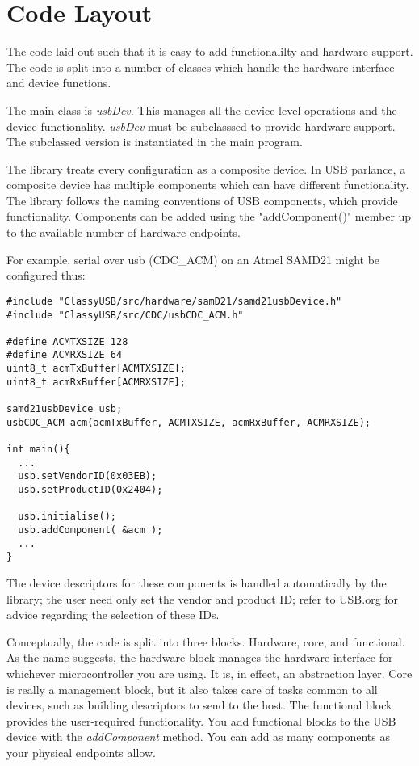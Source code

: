 \chapter{Code Layout}

The code laid out such that it is easy to add functionalilty and hardware support. The code is split into a number of classes which handle the hardware interface and device functions.

The main class is \emph{usbDev}. This manages all the device-level operations and the device functionality. \emph{usbDev} must be subclasssed to provide hardware support. The subclassed version is instantiated in the main program.

The library treats every configuration as a composite device. In USB parlance, a composite device has multiple components which can have different functionality. The library follows the naming conventions of USB components, which provide functionality. Components can be added using the "addComponent()" member up to the available number of hardware endpoints.

For example, serial over usb (CDC\_ACM) on an Atmel SAMD21 might be configured thus:

\begin{verbatim}
#include "ClassyUSB/src/hardware/samD21/samd21usbDevice.h"
#include "ClassyUSB/src/CDC/usbCDC_ACM.h"

#define ACMTXSIZE 128
#define ACMRXSIZE 64
uint8_t acmTxBuffer[ACMTXSIZE];
uint8_t acmRxBuffer[ACMRXSIZE];

samd21usbDevice usb;
usbCDC_ACM acm(acmTxBuffer, ACMTXSIZE, acmRxBuffer, ACMRXSIZE);

int main(){
  ...
  usb.setVendorID(0x03EB);
  usb.setProductID(0x2404);

  usb.initialise();
  usb.addComponent( &acm );
  ...
}
\end{verbatim}

The device descriptors for these components is handled automatically by the library; the user need only set the vendor and product ID; refer to USB.org for advice regarding the selection of these IDs.

Conceptually, the code is split into three blocks. Hardware, core, and functional. As the name suggests, the hardware block manages the hardware interface for whichever microcontroller you are using. It is, in effect, an abstraction layer. Core is really a management block, but it also takes care of tasks common to all devices, such as building descriptors to send to the host. The functional block provides the user-required functionality. You add functional blocks to the USB device with the \emph{addComponent} method. You can add as many components as your physical endpoints allow.
